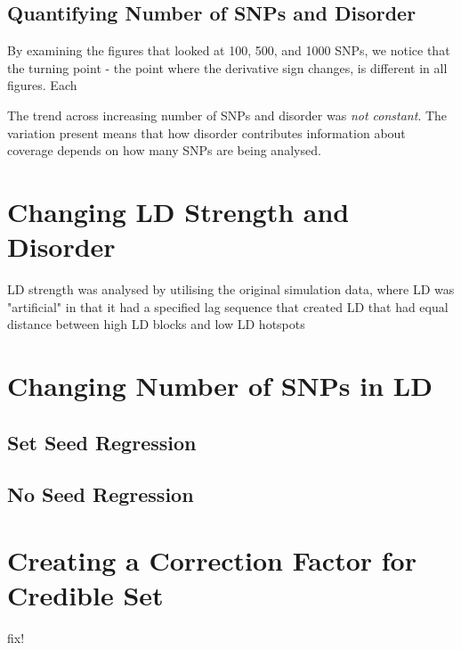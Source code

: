 \pagebreak

\subsection{Quantifying Number of SNPs and Disorder}
By examining the figures that looked at 100, 500, and 1000 SNPs, we notice that the turning point - the point where the  derivative sign changes, is different in all figures. Each 

The trend across increasing number of SNPs and disorder was \emph{not constant}. The variation present means that how disorder contributes information about coverage depends on how many SNPs are being analysed. 







\section{Changing LD Strength and Disorder}
LD strength was analysed by utilising the original simulation data, where LD was "artificial" in that it had a specified lag sequence that created LD that had equal distance between high LD blocks and low LD hotspots 



\section{Changing Number of SNPs in LD}





\subsection{Set Seed Regression}

\subsection{No Seed Regression}


\section{Creating a Correction Factor for Credible Set }
fix!